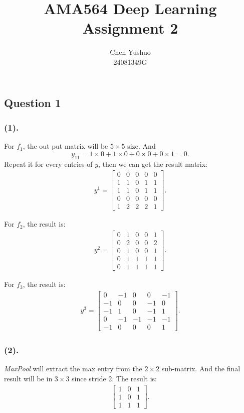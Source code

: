 \documentclass{article}
\begin{document}
\title{\vspace{-3cm}\textbf{AMA564 Deep Learning Assignment 2}}
\author{Chen Yushuo\\24081349G}
\maketitle
\subsection*{Question 1}
\subsubsection*{(1).}
For $f_1$, the out put matrix will be $5\times 5$ size. And 
\[y_{11} = 1\times 0 + 1\times 0 +0\times 0+0\times 1 = 0.\]
Repeat it for every entries of $y$, then we can get the result matrix:
\begin{align*}
  y^1 = \begin{bmatrix}
    0&0&0&0&0\\
    1&1&0&1&1\\
    1&1&0&1&1\\
    0&0&0&0&0\\
    1&2&2&2&1
  \end{bmatrix}.
\end{align*}

For $f_2$, the result is:
\begin{align*}
  y^2 = \begin{bmatrix}
    0&1&0&0&1\\
    0&2&0&0&2\\
    0&1&0&0&1\\
    0&1&1&1&1\\
    0&1&1&1&1
  \end{bmatrix}.
\end{align*}

For $f_3$, the result is:
\begin{align*}
  y^3 = \begin{bmatrix}
    0&-1&0&0&-1\\
    -1&0&0&-1&0\\
    -1&1&0&-1&1\\
    0&-1&-1&-1&-1\\
    -1&0&0&0&1
  \end{bmatrix}.
\end{align*}

\subsubsection*{(2).}
{\it MaxPool} will extract the max entry from the $2\times 2$ sub-matrix.
And the final result will be in $3\times 3$ since stride 2.
The result is:
\begin{align*}
  \begin{bmatrix}
    1&0&1\\
    1&0&1\\
    1&1&1
  \end{bmatrix}.
\end{align*}
\end{document}
